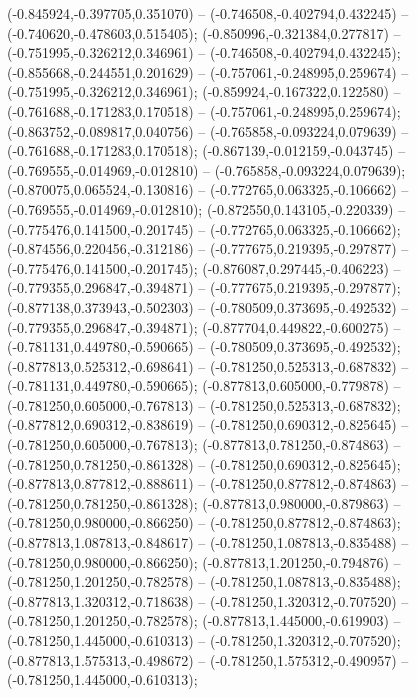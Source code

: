  (-0.845924,-0.397705,0.351070) -- (-0.746508,-0.402794,0.432245) -- (-0.740620,-0.478603,0.515405);
 (-0.850996,-0.321384,0.277817) -- (-0.751995,-0.326212,0.346961) -- (-0.746508,-0.402794,0.432245);
 (-0.855668,-0.244551,0.201629) -- (-0.757061,-0.248995,0.259674) -- (-0.751995,-0.326212,0.346961);
 (-0.859924,-0.167322,0.122580) -- (-0.761688,-0.171283,0.170518) -- (-0.757061,-0.248995,0.259674);
 (-0.863752,-0.089817,0.040756) -- (-0.765858,-0.093224,0.079639) -- (-0.761688,-0.171283,0.170518);
 (-0.867139,-0.012159,-0.043745) -- (-0.769555,-0.014969,-0.012810) -- (-0.765858,-0.093224,0.079639);
 (-0.870075,0.065524,-0.130816) -- (-0.772765,0.063325,-0.106662) -- (-0.769555,-0.014969,-0.012810);
 (-0.872550,0.143105,-0.220339) -- (-0.775476,0.141500,-0.201745) -- (-0.772765,0.063325,-0.106662);
 (-0.874556,0.220456,-0.312186) -- (-0.777675,0.219395,-0.297877) -- (-0.775476,0.141500,-0.201745);
 (-0.876087,0.297445,-0.406223) -- (-0.779355,0.296847,-0.394871) -- (-0.777675,0.219395,-0.297877);
 (-0.877138,0.373943,-0.502303) -- (-0.780509,0.373695,-0.492532) -- (-0.779355,0.296847,-0.394871);
 (-0.877704,0.449822,-0.600275) -- (-0.781131,0.449780,-0.590665) -- (-0.780509,0.373695,-0.492532);
 (-0.877813,0.525312,-0.698641) -- (-0.781250,0.525313,-0.687832) -- (-0.781131,0.449780,-0.590665);
 (-0.877813,0.605000,-0.779878) -- (-0.781250,0.605000,-0.767813) -- (-0.781250,0.525313,-0.687832);
 (-0.877812,0.690312,-0.838619) -- (-0.781250,0.690312,-0.825645) -- (-0.781250,0.605000,-0.767813);
 (-0.877813,0.781250,-0.874863) -- (-0.781250,0.781250,-0.861328) -- (-0.781250,0.690312,-0.825645);
 (-0.877813,0.877812,-0.888611) -- (-0.781250,0.877812,-0.874863) -- (-0.781250,0.781250,-0.861328);
 (-0.877813,0.980000,-0.879863) -- (-0.781250,0.980000,-0.866250) -- (-0.781250,0.877812,-0.874863);
 (-0.877813,1.087813,-0.848617) -- (-0.781250,1.087813,-0.835488) -- (-0.781250,0.980000,-0.866250);
 (-0.877813,1.201250,-0.794876) -- (-0.781250,1.201250,-0.782578) -- (-0.781250,1.087813,-0.835488);
 (-0.877813,1.320312,-0.718638) -- (-0.781250,1.320312,-0.707520) -- (-0.781250,1.201250,-0.782578);
 (-0.877813,1.445000,-0.619903) -- (-0.781250,1.445000,-0.610313) -- (-0.781250,1.320312,-0.707520);
 (-0.877813,1.575313,-0.498672) -- (-0.781250,1.575312,-0.490957) -- (-0.781250,1.445000,-0.610313);
